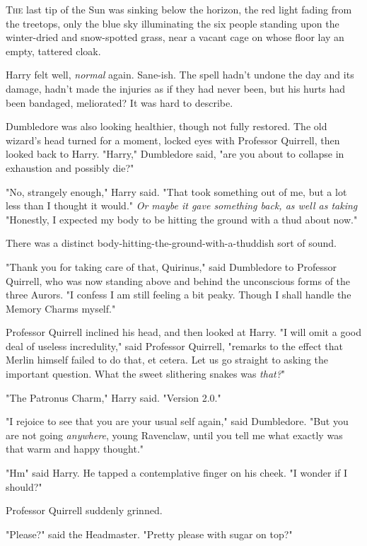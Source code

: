 
\lettrine{T}{he} last tip of
the Sun was sinking below the horizon, the red light fading from the treetops,
only the blue sky illuminating the six people standing upon the winter-dried
and snow-spotted grass, near a vacant cage on whose floor lay an empty,
tattered cloak.

Harry felt{\el} well, \emph{normal} again. Sane-ish. The spell hadn't undone
the day and its damage, hadn't made the injuries as if they had never been, but
his hurts had been{\el} bandaged, meliorated? It was hard to describe.

Dumbledore was also looking healthier, though not fully restored. The old
wizard's head turned for a moment, locked eyes with Professor Quirrell, then
looked back to Harry. "Harry," Dumbledore said, "are you about to collapse in
exhaustion and possibly die?"

"No, strangely enough," Harry said. "That took something out of me, but a lot
less than I thought it would." \emph{Or maybe it gave something back, as well
as taking{\el}} "Honestly, I expected my body to be hitting the ground with
a thud about now."

There was a distinct body-hitting-the-ground-with-a-thuddish sort of sound.

"Thank you for taking care of that, Quirinus," said Dumbledore to Professor
Quirrell, who was now standing above and behind the unconscious forms of the
three Aurors. "I confess I am still feeling a bit peaky. Though I shall handle
the Memory Charms myself."

Professor Quirrell inclined his head, and then looked at Harry. "I will omit a
good deal of useless incredulity," said Professor Quirrell, "remarks to the
effect that Merlin himself failed to do that, et cetera. Let us go straight to
asking the important question. What the sweet slithering snakes was
\emph{that?}"

"The Patronus Charm," Harry said. "Version 2.0."

"I rejoice to see that you are your usual self again," said Dumbledore. "But
you are not going \emph{anywhere}, young Ravenclaw, until you tell me what
exactly was that warm and happy thought."

"Hm{\el}" said Harry. He tapped a contemplative finger on his cheek. "I
wonder if I should?"

Professor Quirrell suddenly grinned.

"Please?" said the Headmaster. "Pretty please with sugar on top?"

